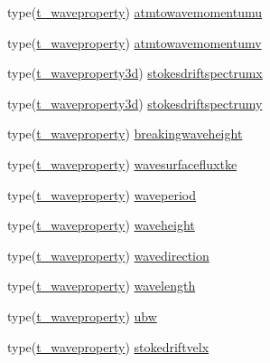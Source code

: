 \begin{DoxyCompactItemize}
\item 
type(\mbox{\hyperlink{structmodulewaves_1_1t__waveproperty}{t\+\_\+waveproperty}}) \mbox{\hyperlink{structmodulewaves_1_1t__waves_a02b166931a0be26c2a41775eb253b979}{atmtowavemomentumu}}
\item 
type(\mbox{\hyperlink{structmodulewaves_1_1t__waveproperty}{t\+\_\+waveproperty}}) \mbox{\hyperlink{structmodulewaves_1_1t__waves_a2efac4332b9b988027633e843cc633a7}{atmtowavemomentumv}}
\item 
type(\mbox{\hyperlink{structmodulewaves_1_1t__waveproperty3d}{t\+\_\+waveproperty3d}}) \mbox{\hyperlink{structmodulewaves_1_1t__waves_ad6ae5469e4d7278dd3237cf2d7f1427e}{stokesdriftspectrumx}}
\item 
type(\mbox{\hyperlink{structmodulewaves_1_1t__waveproperty3d}{t\+\_\+waveproperty3d}}) \mbox{\hyperlink{structmodulewaves_1_1t__waves_af0add631a2ce6a0542aee3e12020c86c}{stokesdriftspectrumy}}
\item 
type(\mbox{\hyperlink{structmodulewaves_1_1t__waveproperty}{t\+\_\+waveproperty}}) \mbox{\hyperlink{structmodulewaves_1_1t__waves_a5f69d81cd9c0c67c1a22931c62be41fd}{breakingwaveheight}}
\item 
type(\mbox{\hyperlink{structmodulewaves_1_1t__waveproperty}{t\+\_\+waveproperty}}) \mbox{\hyperlink{structmodulewaves_1_1t__waves_a1f1458e62ea1b76752c1e9383ad20a2f}{wavesurfacefluxtke}}
\item 
type(\mbox{\hyperlink{structmodulewaves_1_1t__waveproperty}{t\+\_\+waveproperty}}) \mbox{\hyperlink{structmodulewaves_1_1t__waves_af8682a9b70163d500e7bad728aa97d92}{waveperiod}}
\item 
type(\mbox{\hyperlink{structmodulewaves_1_1t__waveproperty}{t\+\_\+waveproperty}}) \mbox{\hyperlink{structmodulewaves_1_1t__waves_a9551634936b54b070971ec82b5fb2f3c}{waveheight}}
\item 
type(\mbox{\hyperlink{structmodulewaves_1_1t__waveproperty}{t\+\_\+waveproperty}}) \mbox{\hyperlink{structmodulewaves_1_1t__waves_a09bd2ae97619f50b525e8f5576acfbed}{wavedirection}}
\item 
type(\mbox{\hyperlink{structmodulewaves_1_1t__waveproperty}{t\+\_\+waveproperty}}) \mbox{\hyperlink{structmodulewaves_1_1t__waves_a6b2aef91b6ffb973e7e1e1c416be6c55}{wavelength}}
\item 
type(\mbox{\hyperlink{structmodulewaves_1_1t__waveproperty}{t\+\_\+waveproperty}}) \mbox{\hyperlink{structmodulewaves_1_1t__waves_a5ff747a019db81b47ff4221371390487}{ubw}}
\item 
type(\mbox{\hyperlink{structmodulewaves_1_1t__waveproperty}{t\+\_\+waveproperty}}) \mbox{\hyperlink{structmodulewaves_1_1t__waves_a4f2fbbbdcc6d5bdd66926868a028f960}{stokedriftvelx}}

\end{DoxyCompactItemize}
